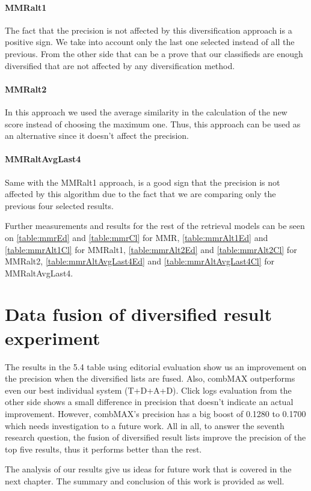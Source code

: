  \paragraph{MMRalt1}

The fact that the precision is not affected by this diversification approach is a positive sign. We take into account only the last one selected instead of all the previous. From the other side that can be a prove that our classifieds are enough diversified that are not affected by any diversification method.


 \paragraph{MMRalt2}

In this approach we used the average similarity in the calculation of the new score instead of choosing the maximum one. Thus, this approach can be used as an alternative since it doesn't affect the precision.


 \paragraph{MMRaltAvgLast4}

 Same with the MMRalt1 approach, is a good sign that the precision is not affected by this algorithm due to the fact that we are comparing only the previous four selected results.


Further measurements and results for the rest of the retrieval models can be seen on \ref{table:mmrEd} and \ref{table:mmrCl} for MMR, \ref{table:mmrAlt1Ed} and \ref{table:mmrAlt1Cl} for MMRalt1, \ref{table:mmrAlt2Ed} and \ref{table:mmrAlt2Cl} for MMRalt2,  \ref{table:mmrAltAvgLast4Ed} and \ref{table:mmrAltAvgLast4Cl} for MMRaltAvgLast4.

\section{Data fusion of diversified result experiment}

The results in the 5.4 table using editorial evaluation show us an improvement on the precision when the diversified lists are fused. Also, combMAX outperforms even our best individual system (T+D+A+D).  Click logs evaluation from the other side shows a small difference in precision that doesn't indicate an actual improvement. However, combMAX's precision has a big boost of 0.1280 to 0.1700 which needs investigation to a future work. All in all, to answer the seventh research question, the fusion of diversified result lists improve the precision of the top five results, thus it performs better than the rest.

The analysis of our results give us ideas for future work that is covered in the next chapter. The summary and conclusion of this work is provided as well.